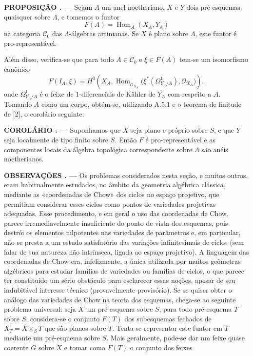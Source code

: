 \documentclass[11pt,twoside,openany]{book}
\numberwithin{equation}{section}
\newcommand{\src}[1]{%
  \phantomsection\hypertarget{src:#1}{}%
  \marginpar{\raggedleft\footnotesize\sffamily #1}%
}
\theoremstyle{plain}
\theoremstyle{definition}
\theoremstyle{remark}
\newcommand{\result}[2]{%
  \par\medskip\noindent\textbf{#1%
  \if\relax\detokenize{#2}\relax\else\space#2\fi. ---}\enspace
}
\newcommand{\FgaUnitKey}{frontmatter}
\renewcommand{\src}[1]{%
  \phantomsection\hypertarget{src:\FgaUnitKey:#1}{}%
  \marginpar{\raggedleft\footnotesize\sffamily #1}%
}
\begin{document}
\src{382}
\result{PROPOSIÇÃO}{2.1} Sejam $\Lambda$ um anel noetheriano, $X$ e $Y$ dois
pré-esquemas quaisquer sobre $\Lambda$, e tomemos o funtor
\[
  F(A)=\operatorname{Hom}_A(X_A,Y_A)
\]
na categoria $\mathcal C_0$ das $\Lambda$-álgebras artinianas. Se $X$ é
plano sobre $\Lambda$, este funtor é pro-representável.

Além disso, verifica-se que para todo $A\in\mathcal C_0$ e $\xi\in F(A)$ tem-se
um isomorfismo canônico
\[
  F(I_A,\xi)=H^0\!\left(
    X_A,
    \underline{\operatorname{Hom}}_{\mathcal O_{X_A}}
    \bigl(\xi^*(\Omega^1_{Y_A/A}),\mathcal O_{X_A}\bigr)
  \right),
\]
onde $\Omega^1_{Y_A/A}$ é o feixe de $1$-diferenciais de Kähler de $Y_A$
com respeito a $A$. Tomando $A$ como um corpo, obtém-se, utilizando A.5.1 e o
teorema de finitude de [2], o corolário seguinte:

\result{COROLÁRIO}{} Suponhamos que $X$ seja plano e próprio sobre $S$, e que $Y$
seja localmente de tipo finito sobre $S$. Então $F$ é pro-representável e as
componentes locais da álgebra topológica correspondente sobre $\Lambda$ são
anéis noetherianos.

\result{OBSERVAÇÕES}{} Os problemas considerados nesta seção, e muitos
outros, eram habitualmente estudados, no âmbito da geometria algébrica
clássica, mediante as «coordenadas de Chow» dos ciclos no espaço
projetivo, que permitiam considerar esses ciclos como pontos de variedades
projetivas adequadas. Esse procedimento, e em geral o uso das
coordenadas de Chow, parece irremediavelmente insuficiente do ponto de
vista dos esquemas, pois destrói os elementos nilpotentes nas
variedades de parâmetros e, em particular, não se presta a um estudo
satisfatório das variações infinitesimais de ciclos (sem falar de sua
natureza não intrínseca, ligada ao espaço projetivo). A linguagem das
coordenadas de Chow era, infelizmente, a única utilizada por muitos
geômetras algébricos para estudar famílias de variedades ou famílias de
ciclos, o que parece ter constituído um sério obstáculo para esclarecer essas
noções, apesar de seu indubitável interesse técnico (provavelmente provisório). Se
se quiser obter o análogo das variedades de Chow na teoria dos
esquemas, chega-se ao seguinte problema universal: seja $X$ um pré-esquema sobre
$S$; para todo pré-esquema $T$ sobre $S$, considera-se o conjunto $F(T)$ dos
subesquemas fechados de $X_T=X\times_ST$ que são planos sobre $T$. Tenta-se
representar este funtor em $T$ mediante um pré-esquema sobre $S$. Mais
geralmente, pode-se dar um feixe quase coerente $G$ sobre $X$ e tomar como
$F(T)$ o conjunto dos feixes
\end{document}

